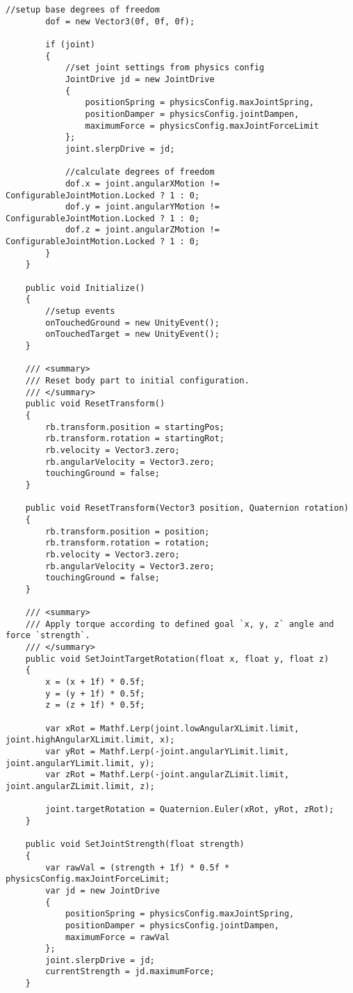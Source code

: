 \begin{lstlisting}[caption={Körperteil Skript},captionpos=b,label={lst:skript_körperteil}]
        //setup base degrees of freedom
        dof = new Vector3(0f, 0f, 0f);

        if (joint)
        {
            //set joint settings from physics config
            JointDrive jd = new JointDrive
            {
                positionSpring = physicsConfig.maxJointSpring,
                positionDamper = physicsConfig.jointDampen,
                maximumForce = physicsConfig.maxJointForceLimit
            };
            joint.slerpDrive = jd;

            //calculate degrees of freedom
            dof.x = joint.angularXMotion != ConfigurableJointMotion.Locked ? 1 : 0;
            dof.y = joint.angularYMotion != ConfigurableJointMotion.Locked ? 1 : 0;
            dof.z = joint.angularZMotion != ConfigurableJointMotion.Locked ? 1 : 0;
        }
    }

    public void Initialize()
    {
        //setup events
        onTouchedGround = new UnityEvent();
        onTouchedTarget = new UnityEvent();
    }

    /// <summary>
    /// Reset body part to initial configuration.
    /// </summary>
    public void ResetTransform()
    {
        rb.transform.position = startingPos;
        rb.transform.rotation = startingRot;
        rb.velocity = Vector3.zero;
        rb.angularVelocity = Vector3.zero;
        touchingGround = false;
    }

    public void ResetTransform(Vector3 position, Quaternion rotation)
    {
        rb.transform.position = position;
        rb.transform.rotation = rotation;
        rb.velocity = Vector3.zero;
        rb.angularVelocity = Vector3.zero;
        touchingGround = false;
    }

    /// <summary>
    /// Apply torque according to defined goal `x, y, z` angle and force `strength`.
    /// </summary>
    public void SetJointTargetRotation(float x, float y, float z)
    {
        x = (x + 1f) * 0.5f;
        y = (y + 1f) * 0.5f;
        z = (z + 1f) * 0.5f;

        var xRot = Mathf.Lerp(joint.lowAngularXLimit.limit, joint.highAngularXLimit.limit, x);
        var yRot = Mathf.Lerp(-joint.angularYLimit.limit, joint.angularYLimit.limit, y);
        var zRot = Mathf.Lerp(-joint.angularZLimit.limit, joint.angularZLimit.limit, z);

        joint.targetRotation = Quaternion.Euler(xRot, yRot, zRot);
    }

    public void SetJointStrength(float strength)
    {
        var rawVal = (strength + 1f) * 0.5f * physicsConfig.maxJointForceLimit;
        var jd = new JointDrive
        {
            positionSpring = physicsConfig.maxJointSpring,
            positionDamper = physicsConfig.jointDampen,
            maximumForce = rawVal
        };
        joint.slerpDrive = jd;
        currentStrength = jd.maximumForce;
    }


\end{lstlisting}
